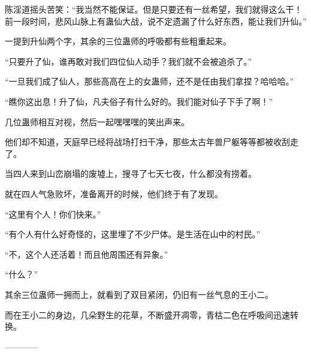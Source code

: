 \begin{this_body}
陈淫道摇头苦笑：“我当然不能保证。但是只要还有一丝希望，我们就得这么干！前一段时间，悲风山脉上有蛊仙大战，说不定遗漏了什么好东西，能让我们升仙。”

一提到升仙两个字，其余的三位蛊师的呼吸都有些粗重起来。

“只要升了仙，谁再敢对我们四位仙人动手？我们就不会被追杀了。”

“一旦我们成了仙人，那些高高在上的女蛊师，还不是任由我们拿捏？哈哈哈。”

“瞧你这出息！升了仙，凡夫俗子有什么好的。我们能对仙子下手了啊！”

几位蛊师相互对视，然后一起嘿嘿嘿的笑出声来。

他们却不知道，天庭早已经将战场打扫干净，那些太古年兽尸躯等等都被收刮走了。

当四人来到山峦崩塌的废墟上，搜寻了七天七夜，什么都没有捞着。

就在四人气急败坏，准备离开的时候，他们终于有了发现。

“这里有个人！你们快来。”

“有个人有什么好奇怪的，这里埋了不少尸体。是生活在山中的村民。”

“不，这个人还活着！而且他周围还有异象。”

“什么？”

其余三位蛊师一拥而上，就看到了双目紧闭，仍旧有一丝气息的王小二。

而在王小二的身边，几朵野生的花草，不断盛开凋零，青枯二色在呼吸间迅速转换。

------------

\end{this_body}


